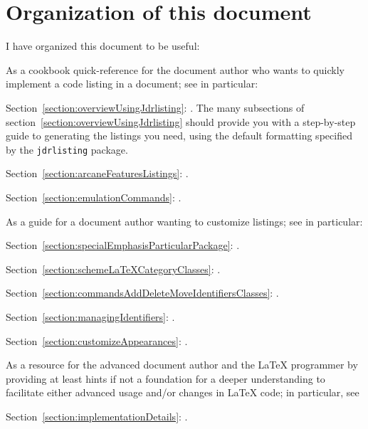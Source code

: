 \documentclass[12pt,table,final]{article}%
\begin{document}
\section{Organization of this document}
\label{section:organizationOfDocument}
I have organized this document to be useful:
\begin{jdr_enumerate}
\item As a cookbook quick-reference for the document author who wants to quickly implement a code listing in a document;
    see in particular:
    \begin{jdr_itemize}
        \item Section~\ref{section:overviewUsingJdrlisting}: . The many subsections of section~\ref{section:overviewUsingJdrlisting} should provide you with a step-by-step guide to generating the listings you need, using the default formatting specified by the \lstinline|jdrlisting| package.
        \item Section~\ref{section:arcaneFeaturesListings}: .
        \item Section~\ref{section:emulationCommands}: .
    \end{jdr_itemize}
\item As a guide for a document author wanting to customize listings; see in particular:
    \begin{jdr_itemize}
        \item Section~\ref{section:specialEmphasisParticularPackage}: .
        \item Section~\ref{section:schemeLaTeXCategoryClasses}: .
        \item Section~\ref{section:commandsAddDeleteMoveIdentifiersClasses}: .
        \item Section~\ref{section:managingIdentifiers}: .
        \item Section~\ref{section:customizeAppearances}: .
    \end{jdr_itemize}
\item As a resource for the advanced document author and the \LaTeX{} programmer by providing at least hints if not a foundation for a deeper understanding to facilitate either advanced usage and/or changes in \LaTeX{} code; in particular, see
    \begin{jdr_itemize}
        \item Section~\ref{section:implementationDetails}: .
    \end{jdr_itemize}
\end{jdr_enumerate}
\end{document}
